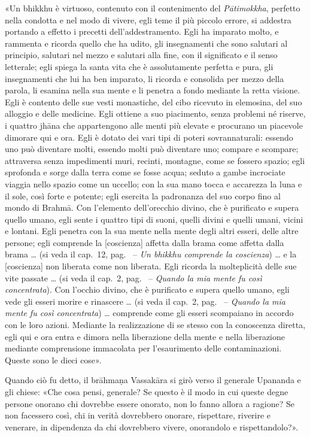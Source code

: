 «Un bhikkhu è virtuoso, contenuto con il contenimento del \emph{Pātimokkha},
perfetto nella condotta e nel modo di vivere, egli teme il più piccolo errore,
si addestra portando a effetto i precetti dell’addestramento. Egli ha imparato
molto, e rammenta e ricorda quello che ha udito, gli insegnamenti che sono
salutari al principio, salutari nel mezzo e salutari alla fine, con il
significato e il senso letterale; egli spiega la santa vita che è assolutamente
perfetta e pura, gli insegnamenti che lui ha ben imparato, li ricorda e
consolida per mezzo della parola, li esamina nella sua mente e li penetra a
fondo mediante la retta visione. Egli è contento delle sue vesti monastiche, del
cibo ricevuto in elemosina, del suo alloggio e delle medicine. Egli ottiene a
suo piacimento, senza problemi né riserve, i quattro jhāna che appartengono alle
menti più elevate e procurano un piacevole dimorare qui e ora. Egli è dotato dei
vari tipi di poteri sovrannaturali: essendo uno può diventare molti, essendo
molti può diventare uno; compare e scompare; attraversa senza impedimenti muri,
recinti, montagne, come se fossero spazio; egli sprofonda e sorge dalla terra
come se fosse acqua; seduto a gambe incrociate viaggia nello spazio come un
uccello; con la sua mano tocca e accarezza la luna e il sole, così forte e
potente; egli esercita la padronanza del suo corpo fino al mondo di Brahmā. Con
l’elemento dell’orecchio divino, che è purificato e supera quello umano, egli
sente i quattro tipi di suoni, quelli divini e quelli umani, vicini e lontani.
Egli penetra con la sua mente nella mente degli altri esseri, delle altre
persone; egli comprende la [coscienza] affetta dalla brama come affetta dalla
brama … (si veda il cap.~12, pag.~\pageref{pag272} -- \emph{Un bhikkhu comprende
  la coscienza}) … e la [coscienza] non liberata come non liberata. Egli ricorda
la molteplicità delle sue vite passate … (si veda il cap.~2,
pag.~\pageref{pag27b} -- \emph{Quando la mia mente fu così concentrata}). Con
l’occhio divino, che è purificato e supera quello umano, egli vede gli esseri
morire e rinascere … (si veda il cap.~2, pag.~\pageref{pag28} -- \emph{Quando la
  mia mente fu così concentrata}) … comprende come gli esseri scompaiano in
accordo con le loro azioni. Mediante la realizzazione di se stesso con la
conoscenza diretta, egli qui e ora entra e dimora nella liberazione della mente
e nella liberazione mediante comprensione immacolata per l’esaurimento delle
contaminazioni. Queste sono le dieci cose».

Quando ciò fu detto, il brāhmaṇa Vassakāra si girò verso il generale Upananda e
gli chiese: «Che cosa pensi, generale? Se questo è il modo in cui queste degne
persone onorano chi dovrebbe essere onorato, non lo fanno allora a ragione? Se
non facessero così, chi in verità dovrebbero onorare, rispettare, riverire e
venerare, in dipendenza da chi dovrebbero vivere, onorandolo e rispettandolo?».

